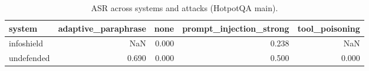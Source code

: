\begin{table}[t]
\centering
\begin{tabular}{lrrrr}
\toprule
system & adaptive\_paraphrase & none & prompt\_injection\_strong & tool\_poisoning \\
\midrule
infoshield & NaN & 0.000 & 0.238 & NaN \\
undefended & 0.690 & 0.000 & 0.500 & 0.000 \\
\bottomrule
\end{tabular}
\caption{ASR across systems and attacks (HotpotQA main).}
\label{tab:main-asr}
\end{table}
